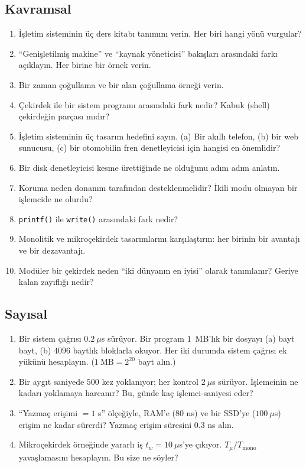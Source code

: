 \documentclass[11pt,a4paper]{article}
\newcommand{\cmd}[1]{\texttt{#1}}
\begin{document}
\subsection*{Kavramsal}
\begin{enumerate}[leftmargin=1.6em]
  \item İşletim sisteminin üç ders kitabı tanımını verin. Her biri hangi yönü vurgular?
  \item ``Genişletilmiş makine'' ve ``kaynak yöneticisi'' bakışları arasındaki farkı açıklayın. Her birine bir örnek verin.
  \item Bir zaman çoğullama ve bir alan çoğullama örneği verin.
  \item Çekirdek ile bir sistem programı arasındaki fark nedir? Kabuk (shell) çekirdeğin parçası mıdır?
  \item İşletim sisteminin üç tasarım hedefini sayın. (a) Bir akıllı telefon, (b) bir web sunucusu, (c) bir otomobilin fren denetleyicisi için hangisi en önemlidir?
  \item Bir disk denetleyicisi kesme ürettiğinde ne olduğunu adım adım anlatın.
  \item Koruma neden donanım tarafından desteklenmelidir? İkili modu olmayan bir işlemcide ne olurdu?
  \item \cmd{printf()} ile \cmd{write()} arasındaki fark nedir?
  \item Monolitik ve mikroçekirdek tasarımlarını karşılaştırın: her birinin bir avantajı ve bir dezavantajı.
  \item Modüler bir çekirdek neden ``iki dünyanın en iyisi'' olarak tanımlanır? Geriye kalan zayıflığı nedir?
\end{enumerate}

\subsection*{Sayısal}
\begin{enumerate}[leftmargin=1.6em,resume]
  \item Bir sistem çağrısı $0.2\ \mu$s sürüyor. Bir program $1$~MB'lık bir dosyayı (a) bayt bayt, (b) $4096$ baytlık bloklarla okuyor. Her iki durumda sistem çağrısı ek yükünü hesaplayın. ($1\ \text{MB} = 2^{20}$ bayt alın.)
  \item Bir aygıt saniyede $500$ kez yoklanıyor; her kontrol $2\ \mu$s sürüyor. İşlemcinin ne kadarı yoklamaya harcanır? Bu, günde kaç işlemci-saniyesi eder?
  \item ``Yazmaç erişimi $=1$ s'' ölçeğiyle, RAM'e ($80$ ns) ve bir SSD'ye ($100\ \mu$s) erişim ne kadar sürerdi? Yazmaç erişim süresini $0.3$ ns alın.
  \item Mikroçekirdek örneğinde yararlı iş $t_{w} = 10\ \mu$s'ye çıkıyor. $T_{\mu}/T_{\text{mono}}$ yavaşlamasını hesaplayın. Bu size ne söyler?
\end{enumerate}
\end{document}
